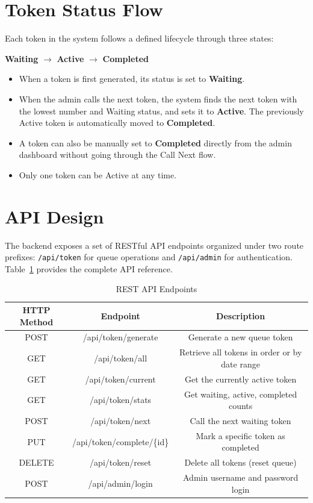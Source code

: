 \section{Token Status Flow}

Each token in the system follows a defined lifecycle through three states:

\begin{center}
\textbf{Waiting} $\rightarrow$ \textbf{Active} $\rightarrow$ \textbf{Completed}
\end{center}

\begin{itemize}
    \item When a token is first generated, its status is set to \textbf{Waiting}.
    \item When the admin calls the next token, the system finds the next token with the lowest number and Waiting status, and sets it to \textbf{Active}. The previously Active token is automatically moved to \textbf{Completed}.
    \item A token can also be manually set to \textbf{Completed} directly from the admin dashboard without going through the Call Next flow.
    \item Only one token can be Active at any time.
\end{itemize}

\section{API Design}

The backend exposes a set of RESTful API endpoints organized under two route prefixes: \texttt{/api/token} for queue operations and \texttt{/api/admin} for authentication. Table~\ref{tab:api} provides the complete API reference.

\begin{table}[htbp]
    \centering
    \begin{tabular}{|c|c|c|}
        \hline
        \textbf{HTTP Method} & \textbf{Endpoint} & \textbf{Description} \\
        \hline
        POST & /api/token/generate & Generate a new queue token \\
        \hline
        GET & /api/token/all & Retrieve all tokens in order or by date range \\
        \hline
        GET & /api/token/current & Get the currently active token \\
        \hline
        GET & /api/token/stats & Get waiting, active, completed counts \\
        \hline
        POST & /api/token/next & Call the next waiting token \\
        \hline
        PUT & /api/token/complete/\{id\} & Mark a specific token as completed \\
        \hline
        DELETE & /api/token/reset & Delete all tokens (reset queue) \\
        \hline
        POST & /api/admin/login & Admin username and password login \\
        \hline
    \end{tabular}
    \caption{REST API Endpoints}
    \label{tab:api}
\end{table}

